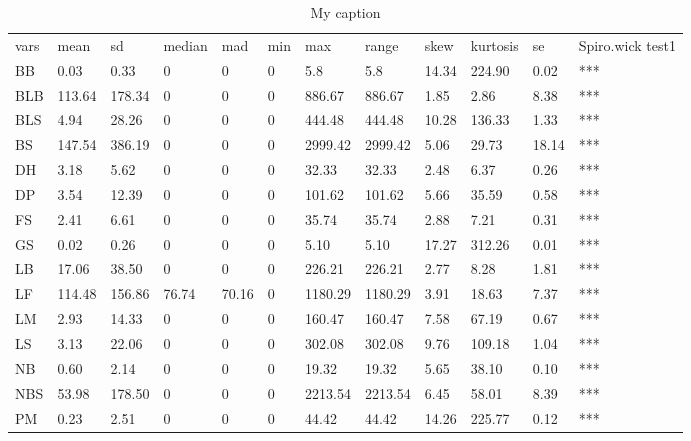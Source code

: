 \begin{table}[]
\centering
\caption{My caption}
\label{my-label}
\begin{tabular}{llllllllllll}
vars & mean   & sd     & median & mad   & min & max     & range   & skew  & kurtosis & se    & Spiro.wick test1 \\
BB   & 0.03   & 0.33   & 0      & 0     & 0   & 5.8     & 5.8     & 14.34 & 224.90   & 0.02  & ***              \\
BLB  & 113.64 & 178.34 & 0      & 0     & 0   & 886.67  & 886.67  & 1.85  & 2.86     & 8.38  & ***              \\
BLS  & 4.94   & 28.26  & 0      & 0     & 0   & 444.48  & 444.48  & 10.28 & 136.33   & 1.33  & ***              \\
BS   & 147.54 & 386.19 & 0      & 0     & 0   & 2999.42 & 2999.42 & 5.06  & 29.73    & 18.14 & ***              \\
DH   & 3.18   & 5.62   & 0      & 0     & 0   & 32.33   & 32.33   & 2.48  & 6.37     & 0.26  & ***              \\
DP   & 3.54   & 12.39  & 0      & 0     & 0   & 101.62  & 101.62  & 5.66  & 35.59    & 0.58  & ***              \\
FS   & 2.41   & 6.61   & 0      & 0     & 0   & 35.74   & 35.74   & 2.88  & 7.21     & 0.31  & ***              \\
GS   & 0.02   & 0.26   & 0      & 0     & 0   & 5.10    & 5.10    & 17.27 & 312.26   & 0.01  & ***              \\
LB   & 17.06  & 38.50  & 0      & 0     & 0   & 226.21  & 226.21  & 2.77  & 8.28     & 1.81  & ***              \\
LF   & 114.48 & 156.86 & 76.74  & 70.16 & 0   & 1180.29 & 1180.29 & 3.91  & 18.63    & 7.37  & ***              \\
LM   & 2.93   & 14.33  & 0      & 0     & 0   & 160.47  & 160.47  & 7.58  & 67.19    & 0.67  & ***              \\
LS   & 3.13   & 22.06  & 0      & 0     & 0   & 302.08  & 302.08  & 9.76  & 109.18   & 1.04  & ***              \\
NB   & 0.60   & 2.14   & 0      & 0     & 0   & 19.32   & 19.32   & 5.65  & 38.10    & 0.10  & ***              \\
NBS  & 53.98  & 178.50 & 0      & 0     & 0   & 2213.54 & 2213.54 & 6.45  & 58.01    & 8.39  & ***              \\
PM   & 0.23   & 2.51   & 0      & 0     & 0   & 44.42   & 44.42   & 14.26 & 225.77   & 0.12  & ***              \\

\end{tabular}
\end{table}

